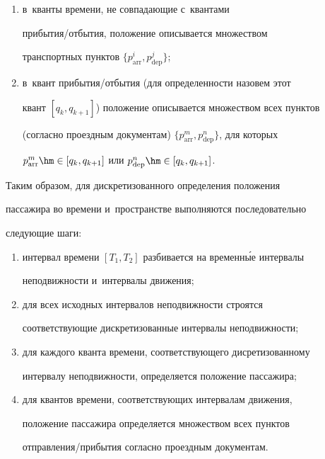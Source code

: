       \begin{enumerate}[(1)]


\item в~кванты времени, не совпадающие с~квантами  


при\-бы\-тия\!/\!от\-бы\-тия, положение описывается множеством 


транспортных пунктов $\{ p^i_{\mathrm{arr}}, p^j_{\mathrm{dep}}\}$;


\item в~квант при\-бы\-тия\!/\!от\-бы\-тия (для определенности назовем этот 


квант $[q_k, q_{k+1}]$) положение описывается множеством всех пунктов 


(согласно проездным документам) $\{ p^m_{\mathrm{arr}}, p^n_{\mathrm{dep}}\}$, для которых 


$p^m_{\mathrm{arr}}\hm\in [q_k, q_{k+1}]$ или $p^n_{\mathrm{dep}}\hm\in [q_k, q_{k+1}]$.


\end{enumerate}





      Таким образом, для дискретизованного определения положения 


пассажира во времени и~пространстве выполняются последовательно 


следующие шаги:


      \begin{enumerate}[(1)]


\item интервал времени $[T_1, T_2]$ разбивается на временн\'{ы}е интервалы 


неподвижности и~интервалы движения;


\item для всех исходных интервалов неподвижности строятся 


соответствующие дискретизованные интервалы неподвижности;


\item для каждого кванта времени, соответствующего дисретизованному 


интервалу неподвижности, определяется положение пассажира;


\item для квантов времени, соответствующих интервалам движения, 


положение пассажира определяется множеством всех пунктов  


от\-прав\-ле\-ния\!/\!при\-бы\-тия согласно проездным документам.


\end{enumerate}


